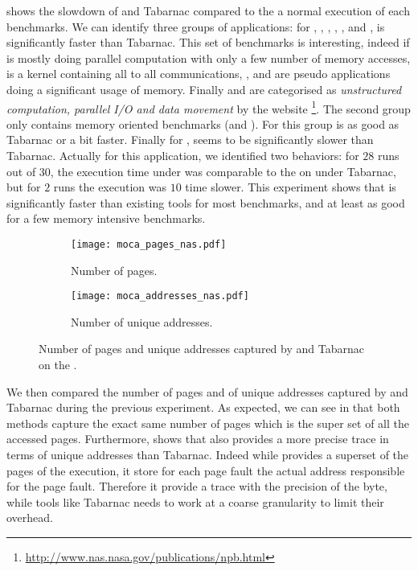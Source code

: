  shows the slowdown of \Moca and Tabarnac compared to the
a normal execution of each benchmarks. We can identify three groups of
applications:  for \BT, \DC, \EP, \FT, \LU, \SP and \UA, \Moca is
significantly faster than Tabarnac. This set of benchmarks is interesting,
indeed if \EP is mostly doing parallel computation with only a few number of
memory accesses, \FT is a kernel containing all to all communications, \BT,
\LU and \SP are pseudo applications doing a significant usage of memory.
Finally \DC and \UA are categorised as \emph{unstructured computation,
parallel I/O and data movement} by the \NPB website
\footnote{\url{http://www.nas.nasa.gov/publications/npb.html}}. The second
group only contains memory oriented benchmarks (\CG and \IS). For this group
\Moca is as good as Tabarnac or a bit faster. Finally for \MG, \Moca seems to
be significantly slower than Tabarnac. Actually for this application, we
identified two behaviors: for $28$ runs out of $30$, the execution time under
\Moca was comparable to the on under Tabarnac, but for $2$ runs the execution
was $10$ time slower.
This experiment shows that \Moca is significantly faster than existing tools
for most benchmarks, and at least as good for a few memory intensive
benchmarks.

\begin{figure}[htb]
    \centering
    \begin{subfigure}{\linewidth}
        \texttt{[image: moca\_pages\_nas.pdf]}
        \caption{Number of pages.}
        \label{fig:pages}
    \end{subfigure}
    \begin{subfigure}{\linewidth}
        \texttt{[image: moca\_addresses\_nas.pdf]}
        \caption{Number of unique addresses.}
        \label{fig:addr}
    \end{subfigure}
    \caption{Number of pages and unique addresses captured by \Moca and Tabarnac
    on the \NPB.}
    \label{fig:pages-addr}
\end{figure}

We then compared the number of pages and of unique addresses captured by \Moca
and Tabarnac during the previous experiment. As expected, we can see in
 that both methods capture the exact same number of
pages which is the super set of all the accessed pages. Furthermore,
 shows that \Moca also provides a more precise trace in
terms of unique addresses than Tabarnac. Indeed while \Moca provides a
superset of the pages of the execution, it store for each page fault the
actual address responsible for the page fault. Therefore it provide a trace
with the precision of the byte, while tools like Tabarnac needs to work at a
coarse granularity to limit their overhead.

